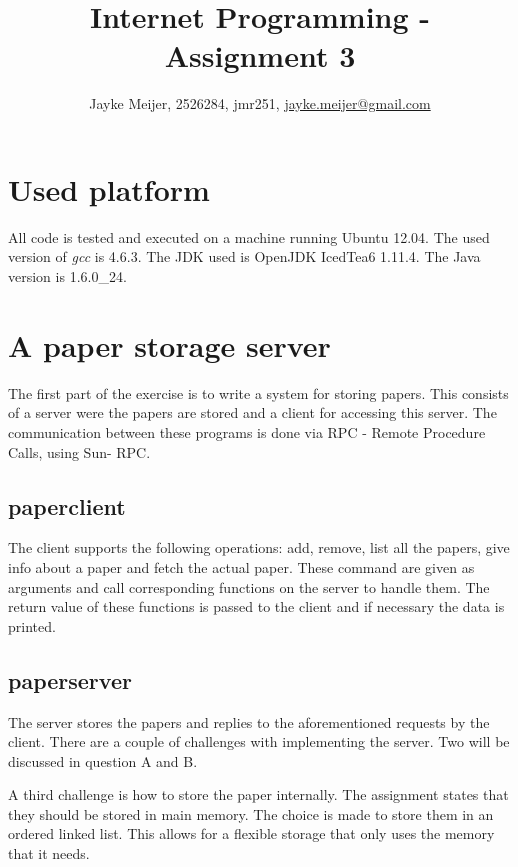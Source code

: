 \documentclass[a4paper]{article}
\title{Internet Programming - Assignment 3}
\author{Jayke Meijer, 2526284, jmr251, \url{jayke.meijer@gmail.com}}
\begin{document}
\maketitle

\tableofcontents
\pagebreak

\section{Used platform}

All code is tested and executed on a machine running Ubuntu 12.04. The used version of
\emph{gcc} is 4.6.3. The JDK used is OpenJDK IcedTea6 1.11.4. The Java version is
1.6.0\_24.

\section{A paper storage server}

The first part of the exercise is to write a system for storing papers. This consists of a
server were the papers are stored and a client for accessing this server. The 
communication between these programs is done via RPC - Remote Procedure Calls, using Sun-
RPC.

\subsection{paperclient}

The client supports the following operations: add, remove, list all the papers, give info
about a paper and fetch the actual paper. These command are given as arguments and
call corresponding functions on the server to handle them. The return value of these 
functions is passed to the client and if necessary the data is printed.

\subsection{paperserver}

The server stores the papers and replies to the aforementioned requests by the client. 
There are a couple of challenges with implementing the server. Two will be discussed in 
question A and B.

A third challenge is how to store the paper internally. The assignment states that
they should be stored in main memory. The choice is made to store them in an ordered 
linked list. This allows for a flexible storage that only uses the memory that it needs.
\end{document}
